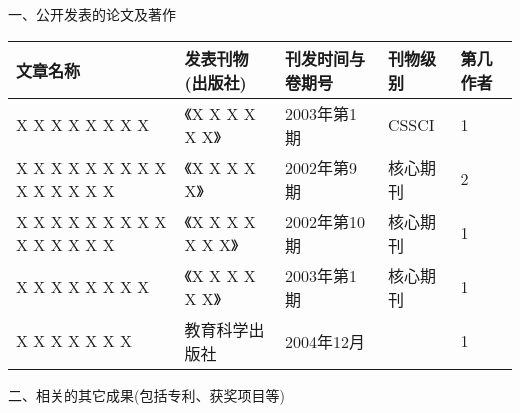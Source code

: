 \achievements

\noindent
一、公开发表的论文及著作
\begin{table}[hbp]
    \linespread{1.1}\selectfont
    \renewcommand\arraystretch{1.2}
    \setlength\tabcolsep{6pt}
    \begin{tabular}{|C{.375\textwidth}|C{.175\textwidth}|C{.14\textwidth}|C{.09\textwidth}|C{.0715\textwidth}|}
        \hline
        \textbf{文章名称} & \textbf{发表刊物(出版社)} & \textbf{刊发时间与卷期号} & \textbf{刊物级别} & \textbf{第几作者} \\ \hline
        X X X X X X X X & 《X X X X X X》 & 2003年第1期 & CSSCI & 1 \\ \hline
        X X X X X X X X X X X X X X X & 《X X X X X》 & 2002年第9期 & 核心期刊 & 2 \\ \hline
        X X X X X X X X X X X X X X X & 《X X X X X X X》 & 2002年第10期 & 核心期刊 & 1 \\ \hline
        X X X X X X X X & 《X X X X X X》 & 2003年第1期 & 核心期刊 & 1 \\ \hline
        X X X X X X X & 教育科学出版社 & 2004年12月 &  & 1 \\ \hline
    \end{tabular}
\end{table}

\noindent
二、相关的其它成果(包括专利、获奖项目等)